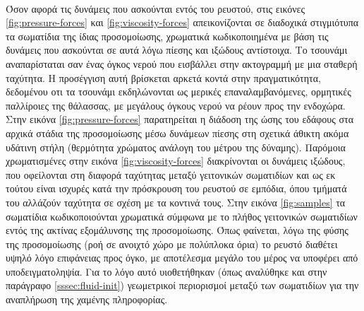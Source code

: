 \paragraph{} Όσον αφορά τις δυνάμεις που ασκούνται εντός του ρευστού, στις εικόνες
\ref{fig:pressure-forces} και \ref{fig:viscosity-forces} απεικονίζονται σε διαδοχικά
στιγμιότυπα τα σωματίδια της ίδιας προσομοίωσης, χρωματικά κωδικοποιημένα με βάση τις
δυνάμεις που ασκούνται σε αυτά λόγω πίεσης και ιξώδους αντίστοιχα. Το τσουνάμι
αναπαρίσταται σαν ένας όγκος νερού που εισβάλλει στην ακτογραμμή με μια σταθερή
ταχύτητα. Η προσέγγιση αυτή βρίσκεται αρκετά κοντά στην πραγματικότητα, δεδομένου οτι τα
τσουνάμι εκδηλώνονται ως μερικές επαναλαμβανόμενες, ορμητικές παλλίροιες της θάλασσας, με
μεγάλους όγκους νερού να ρέουν προς την ενδοχώρα. Στην εικόνα \ref{fig:pressure-forces}
παρατηρείται η διάδοση της ώσης του εδάφους στα αρχικά στάδια της προσομοίωσης μέσω
δυνάμεων πίεσης στη σχετικά άθικτη ακόμα υδάτινη στήλη (θερμότητα χρώματος ανάλογη του
μέτρου της δύναμης). Παρόμοια χρωματισμένες στην εικόνα \ref{fig:viscosity-forces}
διακρίνονται οι δυνάμεις ιξώδους, που οφείλονται στη διαφορά ταχύτητας μεταξύ γειτονικών
σωματιδίων και ως εκ τούτου είναι ισχυρές κατά την πρόσκρουση του ρευστού σε εμπόδια, όπου
τμήματά του αλλάζούν ταχύτητα σε σχέση με τα κοντινά τους. Στην εικόνα \ref{fig:samples}
τα σωματίδια κωδικοποιούνται χρωματικά σύμφωνα με το πλήθος γειτονικών σωματιδίων εντός
της ακτίνας εξομάλυνσης της προσομοίωσης. Όπως φαίνεται, λόγω της φύσης της προσομοίωσης
(ροή σε ανοιχτό χώρο με πολύπλοκα όρια) το ρευστό διαθέτει υψηλό λόγο επιφάνειας προς
όγκο, με αποτέλεσμα μεγάλο του μέρος να υποφέρει από υποδειγματοληψία. Για το λόγο αυτό
υιο\-θε\-τή\-θη\-καν (όπως αναλύθηκε και στην παράγραφο \ref{sssec:fluid-init})
γεωμετρικοί περιορισμοί μεταξύ των σωματιδίων για την αναπλήρωση της χαμένης πληροφορίας.

